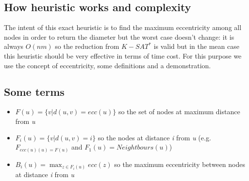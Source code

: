 \subsection{How heuristic works and complexity}
The intent of this exact heuristic is to find the maximum eccentricity among all nodes in order to return the diameter but the worst case doesn't change: it is always $ O(nm) $ so the reduction from $ K-SAT^* $ is valid but in the mean case this heuristic should be very effective in terms of time cost. For this purpose we use the concept of eccentricity, some definitions and a demonstration.
\subsection{Some terms}
\begin{itemize}
	\item $ F(u)  = \{v | d(u,v) = ecc(u)\}$ so the set of nodes at maximum distance from \textit{u}
	\item $ F_i(u)  = \{v | d(u,v) = i\}$ so the nodes at distance \textit{i} from \textit{u} (e.g. $ F_{ecc(u)(u) = F(u)} $ and $ F_{1}(u) = Neightbours(u) $)
	\item $ B_i(u) = \max_{z \in F_i(u)}ecc(z) $ so the maximum eccentricity between nodes at distance \textit{i} from \textit{u}
\end{itemize}
